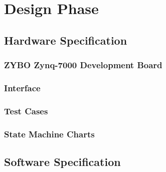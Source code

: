 
\section{Design Phase}

\subsection{Hardware Specification}

\subsubsection{ZYBO Zynq-7000 Development Board}



\subsubsection{Interface}



\subsubsection{Test Cases}



\subsubsection{State Machine Charts}




\subsection{Software Specification}


